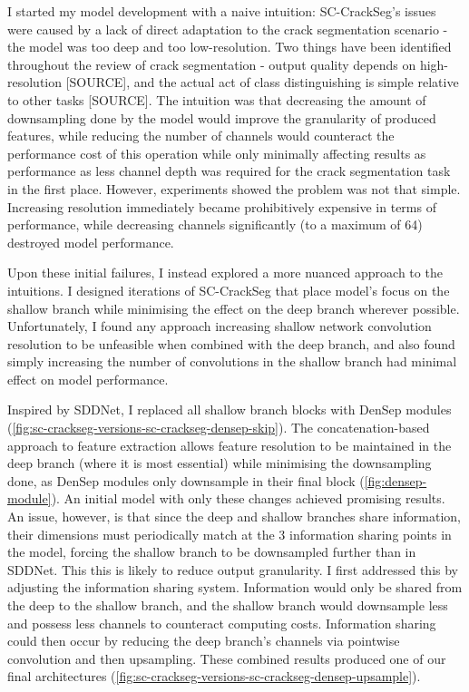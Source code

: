 \documentclass[a4paper,12pt]{report}
\begin{document}
I started my model development with a naive intuition: SC-CrackSeg's issues were caused by a lack of direct adaptation to the crack segmentation scenario - the model was too deep and too low-resolution. Two things have been identified throughout the review of crack segmentation - output quality depends on high-resolution [SOURCE], and the actual act of class distinguishing is simple relative to other tasks [SOURCE]. The intuition was that decreasing the amount of downsampling done by the model would improve the granularity of produced features, while reducing the number of channels would counteract the performance cost of this operation while only minimally affecting results as performance as less channel depth was required for the crack segmentation task in the first place. However, experiments showed the problem was not that simple. Increasing resolution immediately became prohibitively expensive in terms of performance, while decreasing channels significantly (to a maximum of 64) destroyed model performance.

Upon these initial failures, I instead explored a more nuanced approach to the intuitions. I designed iterations of SC-CrackSeg that place model's focus on the shallow branch while minimising the effect on the deep branch wherever possible. Unfortunately, I found any approach increasing shallow network convolution resolution to be unfeasible when combined with the deep branch, and also found simply increasing the number of convolutions in the shallow branch had minimal effect on model performance.

Inspired by SDDNet, I replaced all shallow branch blocks with DenSep modules (\autoref{fig:sc-crackseg-versions-sc-crackseg-densep-skip}). The concatenation-based approach to feature extraction allows feature resolution to be maintained in the deep branch (where it is most essential) while minimising the downsampling done, as DenSep modules only downsample in their final block (\autoref{fig:densep-module}). An initial model with only these changes achieved promising results. An issue, however, is that since the deep and shallow branches share information, their dimensions must periodically match at the 3 information sharing points in the model, forcing the shallow branch to be downsampled further than in SDDNet. This this is likely to reduce output granularity. I first addressed this by adjusting the information sharing system. Information would only be shared from the deep to the shallow branch, and the shallow branch would downsample less and possess less channels to counteract computing costs. Information sharing could then occur by reducing the deep branch's channels via pointwise convolution and then upsampling. These combined results produced one of our final architectures (\autoref{fig:sc-crackseg-versions-sc-crackseg-densep-upsample}).
\end{document}
